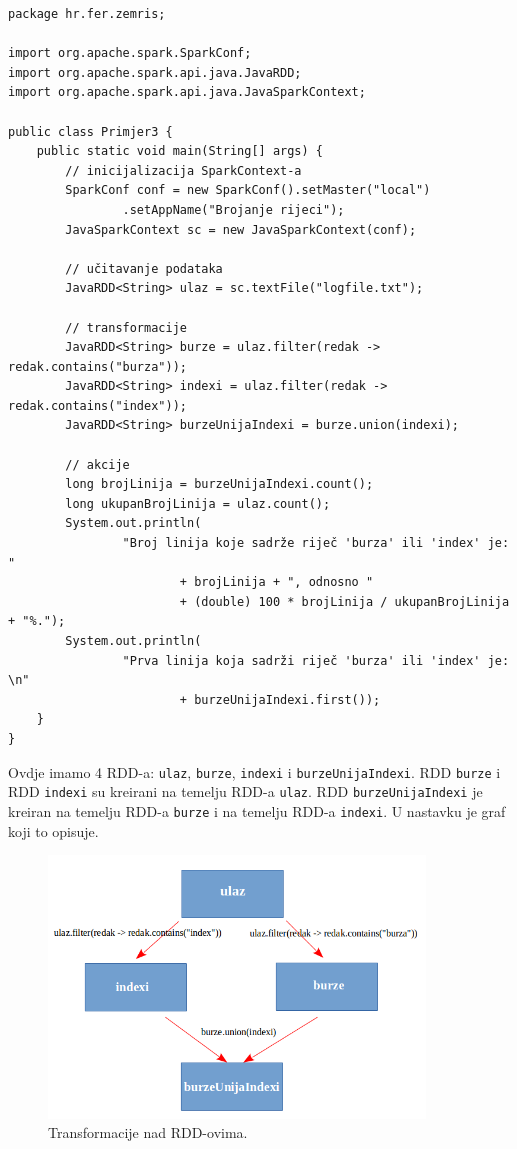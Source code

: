 \documentclass[times, utf8, zavrsni]{fer}
\begin{document}
\vspace{5mm}
\begin{lstlisting}
package hr.fer.zemris;

import org.apache.spark.SparkConf;
import org.apache.spark.api.java.JavaRDD;
import org.apache.spark.api.java.JavaSparkContext;

public class Primjer3 {
	public static void main(String[] args) {
		// inicijalizacija SparkContext-a
		SparkConf conf = new SparkConf().setMaster("local")
				.setAppName("Brojanje rijeci");
		JavaSparkContext sc = new JavaSparkContext(conf);

		// učitavanje podataka
		JavaRDD<String> ulaz = sc.textFile("logfile.txt");

		// transformacije
		JavaRDD<String> burze = ulaz.filter(redak -> redak.contains("burza"));
		JavaRDD<String> indexi = ulaz.filter(redak -> redak.contains("index"));
		JavaRDD<String> burzeUnijaIndexi = burze.union(indexi);

		// akcije
		long brojLinija = burzeUnijaIndexi.count();
		long ukupanBrojLinija = ulaz.count();
		System.out.println(
				"Broj linija koje sadrže riječ 'burza' ili 'index' je: "
						+ brojLinija + ", odnosno "
						+ (double) 100 * brojLinija / ukupanBrojLinija + "%.");
		System.out.println(
				"Prva linija koja sadrži riječ 'burza' ili 'index' je: \n"
						+ burzeUnijaIndexi.first());
	}
}
\end{lstlisting}
\vspace{5mm}

Ovdje imamo 4 RDD-a: \texttt{ulaz}, \texttt{burze}, \texttt{indexi} i \texttt{burzeUnijaIndexi}. RDD \texttt{burze} i RDD \texttt{indexi} su kreirani na temelju RDD-a \texttt{ulaz}. RDD \texttt{burzeUnijaIndexi} je kreiran na temelju RDD-a \texttt{burze} i na temelju RDD-a \texttt{indexi}. U nastavku je graf koji to opisuje.

\begin{figure}[htb]
\centering
\includegraphics[width=10cm]{img/burzeUnijaIndexiRDD.png}
\caption{Transformacije nad RDD-ovima.}
\label{fig:burzeUnijaIndexiRDD}
\end{figure}
\end{document}
